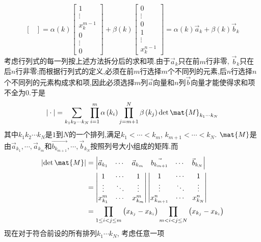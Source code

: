 \documentclass{ctexart}
\begin{document}
\begin{solution}
\begin{enumerate}[label=\tbf{(\alph*)}]
\[\begin{bmatrix}
    \end{bmatrix}=\alpha(k)\begin{bmatrix}
        1\\\vdots\\x_{k}^{m-1}\\0\\\vdots\\0
    \end{bmatrix}+\beta(k)\begin{bmatrix}
        0\\\vdots\\0\\1\\\vdots\\x_k^{n-1}
    \end{bmatrix}=\alpha(k)\vec{a}_k+\beta(k)\vec{b}_k\]
    考虑行列式的每一列按上述方法拆分后的求和项.由于$\vec{a}_k$只在前$m$行非零, $\vec{b}_k$只在后$n$行非零;而根据行列式的定义,必须在前$m$行选择$m$个不同列的元素,后$n$行选择$n$个不同列的元素构成求和项,因此必须选择$m$列$\vec{a}$向量和$n$列$\vec{b}$向量才能使得求和项不全为$0$.于是
    \[|\cdot|=\sum_{k_1k_2\cdots k_N}\prod_{i=1}^{m}\alpha\left(k_i\right)\prod_{j=m+1}^{N}\beta\left(k_j\right)\det\mat{M}_{k_1\cdots k_N}\]
    其中$k_1k_2\cdots k_N$是$1$到$N$的一个排列,满足$k_1<\cdots<k_m$, $k_{m+1}<\cdots<k_N$. $\mat{M}$是由$\vec{a}_{k_1},\cdots,\vec{a}_{k_m}$和$\vec{b_{k_{m+1}}},\cdots,\vec{b}_{k_N}$按照列号大小组成的矩阵.而
    \[\begin{aligned}
        \left|\det\mat{M}\right|
        &=\begin{vmatrix}
        \vec{a}_{k_1}&\cdots&\vec{a}_{k_m}&\vec{b_{k_{m+1}}}&\cdots&\vec{b}_{k_N}
    \end{vmatrix}\\
    &=\begin{vmatrix}
        1&\cdots&1\\
        \vdots&\ddots&\vdots\\
        x_{k_1}^{m}&\cdots&x_{k_m}^{m}
    \end{vmatrix}\begin{vmatrix}
        1&\cdots&1\\
        \vdots&\ddots&\vdots\\
        x_{k_{m+1}}^{n}&\cdots&x_{k_N}^{n}
    \end{vmatrix}\\
    &=\prod_{1\leq i<j\leq m}\left(x_{k_j}-x_{k_i}\right)\prod_{m<i<j\leq N}\left(x_{k_j}-x_{k_i}\right)
    \end{aligned}\]
    现在对于符合前设的所有排列$k_1\cdots k_N$, 考虑任意一项

\end{enumerate}
\end{solution}
\end{document}
